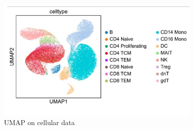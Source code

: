 \documentclass[11pt]{article}
\begin{document}
\begin{figure}[h!]
\centering    
\includegraphics[width=100mm]{umap pic.jpg}
\caption{UMAP on cellular data}
\label{fig: UMAP}
\end{figure}
\end{document}
